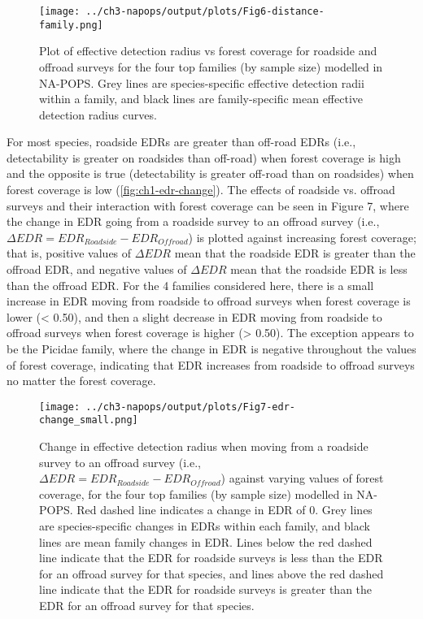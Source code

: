 \begin{figure}[h]
	\centering
	\texttt{[image: ../ch3-napops/output/plots/Fig6-distance-family.png]}
	\caption{\label{fig:ch1-distance-family}Plot of effective detection radius vs forest coverage for roadside and offroad surveys for the four top families (by sample size) modelled in NA-POPS. Grey lines are species-specific effective detection radii within a family, and black lines are family-specific mean effective detection radius curves.}
\end{figure}

\par For most species, roadside EDRs are greater than off-road EDRs (i.e., detectability is greater on roadsides than off-road) when forest coverage is high and the opposite is true (detectability is greater off-road than on roadsides) when forest coverage is low (\autoref{fig:ch1-edr-change}). The effects of roadside vs. offroad surveys and their interaction with forest coverage can be seen in Figure 7, where the change in EDR going from a roadside survey to an offroad survey (i.e., $\Delta EDR = EDR_{Roadside} - EDR_{Offroad}$) is plotted against increasing forest coverage; that is, positive values of $\Delta EDR$ mean that the roadside EDR is greater than the offroad EDR, and negative values of $\Delta EDR$ mean that the roadside EDR is less than the offroad EDR. For the 4 families considered here, there is a small increase in EDR moving from roadside to offroad surveys when forest coverage is lower (< 0.50), and then a slight decrease in EDR moving from roadside to offroad surveys when forest coverage is higher (> 0.50). The exception appears to be the Picidae family, where the change in EDR is negative throughout the values of forest coverage, indicating that EDR increases from roadside to offroad surveys no matter the forest coverage.

\begin{figure}[hbtp]
	\centering
	\texttt{[image: ../ch3-napops/output/plots/Fig7-edr-change\_small.png]}
	\caption{\label{fig:ch1-edr-change}Change in effective detection radius when moving from a roadside survey to an offroad survey (i.e., $\Delta EDR = EDR_{Roadside} - EDR_{Offroad}$) against varying values of forest coverage, for the four top families (by sample size) modelled in NA-POPS. Red dashed line indicates a change in EDR of 0. Grey lines are species-specific changes in EDRs within each family, and black lines are mean family changes in EDR. Lines below the red dashed line indicate that the EDR for roadside surveys is less than the EDR for an offroad survey for that species, and lines above the red dashed line indicate that the EDR for roadside surveys is greater than the EDR for an offroad survey for that species.}
\end{figure}

